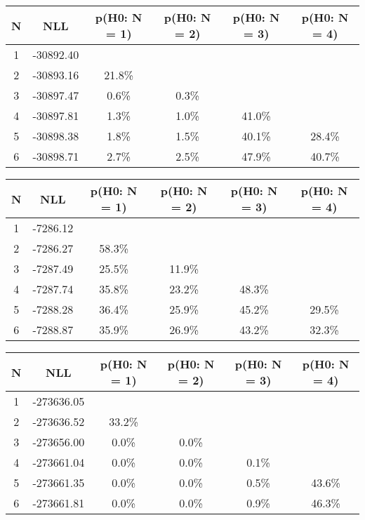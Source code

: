 \begin{table}[htb]
	\begin{center}
{\footnotesize\renewcommand{\arraystretch}{1.4}
		\begin{tabular}{cc||cccc}
			N & NLL & p(H0: N = 1) & p(H0: N = 2) & p(H0: N = 3) & p(H0: N = 4)\\ 
		\hline
1 & -30892.40 & & & & \\
2 & -30893.16 & 21.8\% & & & \\
3 & -30897.47 & 0.6\% & 0.3\% & & \\
4 & -30897.81 & 1.3\% & 1.0\% & 41.0\% & \\
5 & -30898.38 & 1.8\% & 1.5\% & 40.1\% & 28.4\% \\
6 & -30898.71 & 2.7\% & 2.5\% & 47.9\% & 40.7\% \\
	\end{tabular}
		\label{tab:lab}
	}
	\end{center}\end{table}

\begin{table}[htb]
	\begin{center}
{\footnotesize\renewcommand{\arraystretch}{1.4}
		\begin{tabular}{cc||cccc}
			N & NLL & p(H0: N = 1) & p(H0: N = 2) & p(H0: N = 3) & p(H0: N = 4)\\ 
		\hline
1 & -7286.12 & & & & \\
2 & -7286.27 & 58.3\% & & & \\
3 & -7287.49 & 25.5\% & 11.9\% & & \\
4 & -7287.74 & 35.8\% & 23.2\% & 48.3\% & \\
5 & -7288.28 & 36.4\% & 25.9\% & 45.2\% & 29.5\% \\
6 & -7288.87 & 35.9\% & 26.9\% & 43.2\% & 32.3\% \\
	\end{tabular}
		\label{tab:lab}
	}
	\end{center}\end{table}

\begin{table}[htb]
	\begin{center}
{\footnotesize\renewcommand{\arraystretch}{1.4}
		\begin{tabular}{cc||cccc}
			N & NLL & p(H0: N = 1) & p(H0: N = 2) & p(H0: N = 3) & p(H0: N = 4)\\ 
		\hline
1 & -273636.05 & & & & \\
2 & -273636.52 & 33.2\% & & & \\
3 & -273656.00 & 0.0\% & 0.0\% & & \\
4 & -273661.04 & 0.0\% & 0.0\% & 0.1\% & \\
5 & -273661.35 & 0.0\% & 0.0\% & 0.5\% & 43.6\% \\
6 & -273661.81 & 0.0\% & 0.0\% & 0.9\% & 46.3\% \\
	\end{tabular}
		\label{tab:lab}
	}
	\end{center}\end{table}

